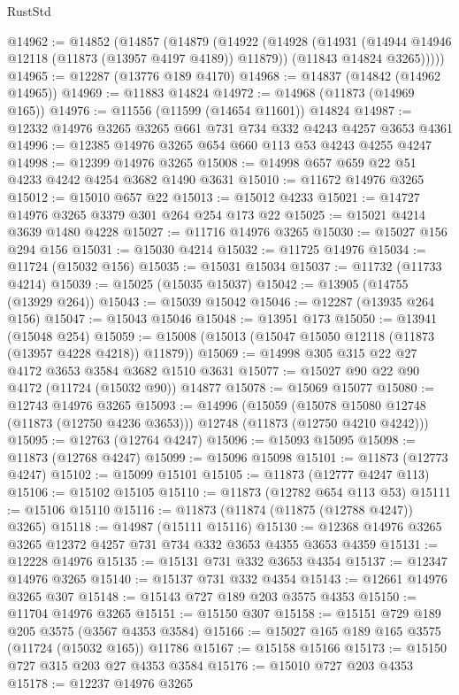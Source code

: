 \begin{lexlean}{RustStd}
\begin{coremodule}
@14962 := @14852
    (@14857
      (@14879
        (@14922
          (@14928
            (@14931 (@14944 @14946 @12118 (@11873 (@13957 @4197 @4189)) @11879))
            (@11843 @14824 @3265)))))
@14965 := @12287 (@13776 @189 @4170)
@14968 := @14837 (@14842 (@14962 @14965))
@14969 := @11883 @14824
@14972 := @14968 (@11873 (@14969 @165))
@14976 := @11556 (@11599 (@14654 @11601)) @14824
@14987 := @12332 @14976 @3265 @3265 @661 @731 @734 @332 @4243 @4257 @3653 @4361
@14996 := @12385 @14976 @3265 @654 @660 @113 @53 @4243 @4255 @4247
@14998 := @12399 @14976 @3265
@15008 := @14998 @657 @659 @22 @51 @4233 @4242 @4254 @3682 @1490 @3631
@15010 := @11672 @14976 @3265
@15012 := @15010 @657 @22
@15013 := @15012 @4233
@15021 := @14727 @14976 @3265 @3379 @301 @264 @254 @173 @22
@15025 := @15021 @4214 @3639 @1480 @4228
@15027 := @11716 @14976 @3265
@15030 := @15027 @156 @294 @156
@15031 := @15030 @4214
@15032 := @11725 @14976
@15034 := @11724 (@15032 @156)
@15035 := @15031 @15034
@15037 := @11732 (@11733 @4214)
@15039 := @15025 (@15035 @15037)
@15042 := @13905 (@14755 (@13929 @264))
@15043 := @15039 @15042
@15046 := @12287 (@13935 @264 @156)
@15047 := @15043 @15046
@15048 := @13951 @173
@15050 := @13941 (@15048 @254)
@15059 := @15008 (@15013 (@15047 @15050 @12118 (@11873 (@13957 @4228 @4218)) @11879))
@15069 := @14998 @305 @315 @22 @27 @4172 @3653 @3584 @3682 @1510 @3631
@15077 := @15027 @90 @22 @90 @4172 (@11724 (@15032 @90)) @14877
@15078 := @15069 @15077
@15080 := @12743 @14976 @3265
@15093 := @14996
    (@15059
      (@15078 @15080 @12748 (@11873 (@12750 @4236 @3653)))
      @12748
      (@11873 (@12750 @4210 @4242)))
@15095 := @12763 (@12764 @4247)
@15096 := @15093 @15095
@15098 := @11873 (@12768 @4247)
@15099 := @15096 @15098
@15101 := @11873 (@12773 @4247)
@15102 := @15099 @15101
@15105 := @11873 (@12777 @4247 @113)
@15106 := @15102 @15105
@15110 := @11873 (@12782 @654 @113 @53)
@15111 := @15106 @15110
@15116 := @11873 (@11874 (@11875 (@12788 @4247)) @3265)
@15118 := @14987 (@15111 @15116)
@15130 := @12368 @14976 @3265 @3265 @12372 @4257 @731 @734 @332 @3653 @4355 @3653 @4359
@15131 := @12228 @14976
@15135 := @15131 @731 @332 @3653 @4354
@15137 := @12347 @14976 @3265
@15140 := @15137 @731 @332 @4354
@15143 := @12661 @14976 @3265 @307
@15148 := @15143 @727 @189 @203 @3575 @4353
@15150 := @11704 @14976 @3265
@15151 := @15150 @307
@15158 := @15151 @729 @189 @205 @3575 (@3567 @4353 @3584)
@15166 := @15027 @165 @189 @165 @3575 (@11724 (@15032 @165)) @11786
@15167 := @15158 @15166
@15173 := @15150 @727 @315 @203 @27 @4353 @3584
@15176 := @15010 @727 @203 @4353
@15178 := @12237 @14976 @3265

\end{coremodule}
\end{lexlean}
